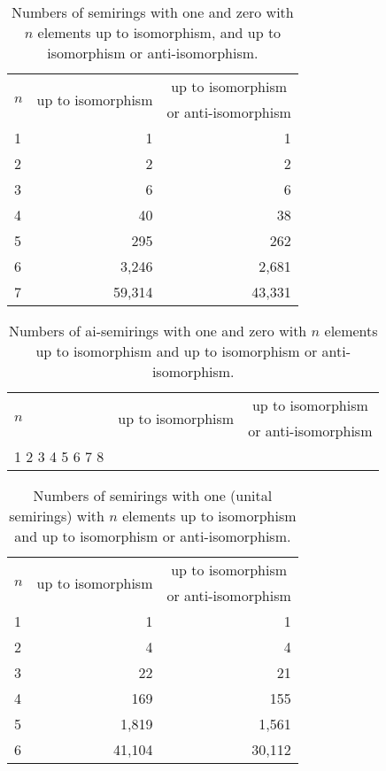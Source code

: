 \documentclass{article}
\theoremstyle{definition}
\theoremstyle{plain}
\begin{document}
\begin{table}[ht]
  \centering
  \begin{tabular}{l|r|r}
    \multirow{2}{*}{$n$} & \multicolumn{1}{|c|}{\multirow{2}{*}{up to
    isomorphism}} & \multicolumn{1}{c}{up to isomorphism} \\
    & & \multicolumn{1}{l}{or anti-isomorphism}\\
    \midrule
    1 & 1         & 1      \\
    2 & 2         & 2      \\
    3 & 6         & 6      \\
    4 & 40        & 38     \\
    5 & 295       & 262    \\
    6 & 3,246     & 2,681  \\
    7 & 59,314    & 43,331
  \end{tabular}
  \caption{Numbers of semirings with one and zero with $n$ elements
    up to isomorphism, and up
  to isomorphism or anti-isomorphism.}
  \label{tab:semirings-with-one-and-zero}
\end{table}

\begin{table}[ht]
  \centering
  \begin{tabular}{l|r|r}
    \multirow{2}{*}{$n$} & \multicolumn{1}{|c|}{\multirow{2}{*}{up to
    isomorphism}} & \multicolumn{1}{c}{up to isomorphism} \\
    & & \multicolumn{1}{l}{or anti-isomorphism}\\
    \midrule
    1
    2
    3
    4
    5
    6
    7
    8
  \end{tabular}
  \caption{Numbers of ai-semirings with one and zero with $n$ elements up to
  isomorphism and up to isomorphism or anti-isomorphism.}
  \label{tab:ai-semirings-with-one-and-zero}
\end{table}

\begin{table}[h]
  \centering
  \begin{tabular}{l|r|r}
    \multirow{2}{*}{$n$} & \multicolumn{1}{|c|}{\multirow{2}{*}{up to
    isomorphism}} & \multicolumn{1}{c}{up to isomorphism} \\
    & & \multicolumn{1}{l}{or anti-isomorphism}\\
    \midrule
    1 & 1         & 1      \\
    2 & 4         & 4      \\
    3 & 22        & 21     \\
    4 & 169       & 155    \\
    5 & 1,819     & 1,561  \\
    6 & 41,104    & 30,112 \\
  \end{tabular}
  \caption{Numbers of semirings with one (unital semirings) with $n$
  elements up to isomorphism and up to isomorphism or anti-isomorphism.}
  \label{tab:unital-semirings}
\end{table}

\printbibliography
\end{document}
